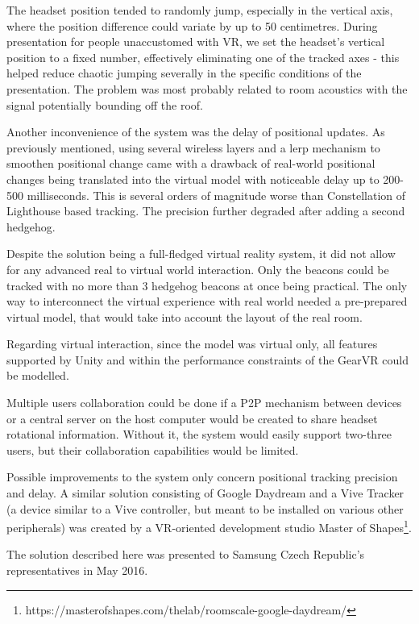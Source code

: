 \documentclass[12pt, a4paper]{article}
\begin{document}
The headset position tended to randomly jump, especially in the vertical axis, where the position difference could variate by up to 50 centimetres. During presentation for people unaccustomed with VR, we set the headset’s vertical position to a fixed number, effectively eliminating one of the tracked axes - this helped reduce chaotic jumping severally in the specific conditions of the presentation. The problem was most probably related to room acoustics with the signal potentially bounding off the roof.

Another inconvenience of the system was the delay of positional updates. As previously mentioned, using several wireless layers and a lerp mechanism to smoothen positional change came with a drawback of real-world positional changes being translated into the virtual model with noticeable delay up to 200-500 milliseconds. This is several orders of magnitude worse than Constellation of Lighthouse based tracking. The precision further degraded after adding a second hedgehog.

Despite the solution being a full-fledged virtual reality system, it did not allow for any advanced real to virtual world interaction. Only the beacons could be tracked with no more than 3 hedgehog beacons at once being practical. The only way to interconnect the virtual experience with real world needed a pre-prepared virtual model, that would take into account the layout of the real room.

Regarding virtual interaction, since the model was virtual only, all features supported by Unity and within the performance constraints of the GearVR could be modelled.

Multiple users collaboration could be done if a P2P mechanism between devices or a central server on the host computer would be created to share headset rotational information. Without it, the system would easily support two-three users, but their collaboration capabilities would be limited.
	
	Possible improvements to the system only concern positional tracking precision and delay. A similar solution consisting of Google Daydream and a Vive Tracker (a device similar to a Vive controller, but meant to be installed on various other peripherals) was created by a VR-oriented development studio Master of Shapes\footnote{https://masterofshapes.com/thelab/roomscale-google-daydream/}.
	
The solution described here was presented to Samsung Czech Republic’s representatives in May 2016.
\end{document}
